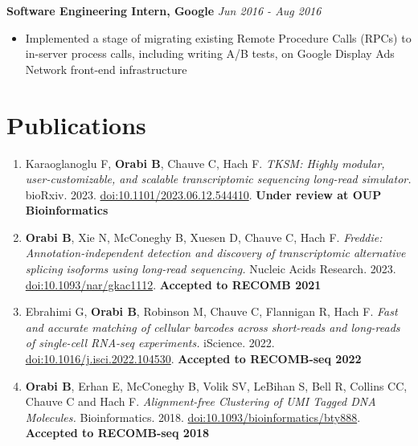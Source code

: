 \documentclass[margin]{res}
\begin{document}
\begin{resume}
    	\textbf{Software Engineering Intern, Google}  \hfill \textit{Jun 2016 - Aug 2016} \\
    	\vspace{-1em}
        \begin{itemize}[leftmargin=*]
    	    \item Implemented a stage of migrating existing Remote Procedure Calls (RPCs) to in-server process calls, including writing A/B tests, on Google Display Ads Network front-end infrastructure
    	\end{itemize}   
    	
    \section{Publications}
    
\begin{enumerate}[leftmargin=*]
    \item Karaoglanoglu F, \textbf{Orabi B}, Chauve C, Hach F. 
    \textit{TKSM: Highly modular, user-customizable, and scalable transcriptomic sequencing long-read simulator.}
    bioRxiv. 2023.  
    \href{https://doi.org/10.1101/2023.06.12.544410}{doi:10.1101/2023.06.12.544410}. \textbf{Under review at OUP Bioinformatics}
    \item \textbf{Orabi B}, Xie N, McConeghy B, Xuesen D, Chauve C, Hach F. 
    \textit{Freddie: Annotation-independent detection and discovery of transcriptomic alternative splicing isoforms using long-read sequencing.}
    Nucleic Acids Research. 2023.  
    \href{https://doi.org/10.1093/nar/gkac1112}{doi:10.1093/nar/gkac1112}. \textbf{Accepted to RECOMB 2021}
    \item Ebrahimi G, \textbf{Orabi B}, Robinson M, Chauve C, Flannigan R, Hach F.
    \textit{Fast and accurate matching of cellular barcodes across short-reads and long-reads of single-cell RNA-seq experiments.}
    iScience. 2022.  
    \href{https://doi.org/10.1016/j.isci.2022.104530}{doi:10.1016/j.isci.2022.104530}. \textbf{Accepted to RECOMB-seq 2022}
    \item \textbf{Orabi B}, Erhan E, McConeghy B, Volik SV, LeBihan S, Bell R, Collins CC, Chauve C and Hach F. 
    \textit{Alignment-free Clustering of UMI Tagged DNA Molecules.} 
    Bioinformatics. 2018.
    \href{https://doi.org/10.1093/bioinformatics/bty888}{doi:10.1093/bioinformatics/bty888}. \textbf{Accepted to RECOMB-seq 2018} 


\end{enumerate}
\end{resume}
\end{document}
